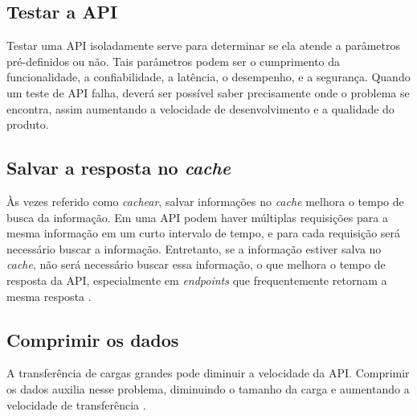 \subsection{Testar a API}
Testar uma API isoladamente serve para determinar se ela atende a parâmetros pré-definidos ou não. Tais parâmetros podem ser o cumprimento da funcionalidade, a confiabilidade, a latência, o desempenho, e a segurança. Quando um teste de API falha, deverá ser possível saber precisamente onde o problema se encontra, assim aumentando a velocidade de desenvolvimento e a qualidade do produto.


\subsection{Salvar a resposta no \emph{cache}}
Às vezes referido como \emph{cachear}, salvar informações no \emph{cache} melhora o tempo de busca da informação. Em uma API podem haver múltiplas requisições para a mesma informação em um curto intervalo de tempo, e para cada requisição será necessário buscar a informação. Entretanto, se a informação estiver salva no \emph{cache}, não será necessário buscar essa informação, o que melhora o tempo de resposta da API, especialmente em \emph{endpoints} que frequentemente retornam a mesma resposta \cite{rapidAPI-twitter}.

\subsection{Comprimir os dados}
A transferência de cargas grandes pode diminuir a velocidade da API. Comprimir os dados auxilia nesse problema, diminuindo o tamanho da carga e aumentando a velocidade de transferência \cite{rapidAPI-twitter}.



